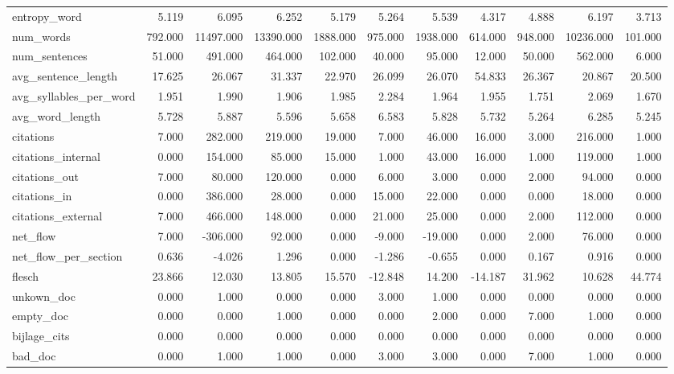 \begin{tabular}{lrrrrrrrrrr}
\cline{1-11}
entropy\_word & 5.119 & 6.095 & 6.252 & 5.179 & 5.264 & 5.539 & 4.317 & 4.888 & 6.197 & 3.713 \\
\cline{1-11}
num\_words & 792.000 & 11497.000 & 13390.000 & 1888.000 & 975.000 & 1938.000 & 614.000 & 948.000 & 10236.000 & 101.000 \\
\cline{1-11}
num\_sentences & 51.000 & 491.000 & 464.000 & 102.000 & 40.000 & 95.000 & 12.000 & 50.000 & 562.000 & 6.000 \\
\cline{1-11}
avg\_sentence\_length & 17.625 & 26.067 & 31.337 & 22.970 & 26.099 & 26.070 & 54.833 & 26.367 & 20.867 & 20.500 \\
\cline{1-11}
avg\_syllables\_per\_word & 1.951 & 1.990 & 1.906 & 1.985 & 2.284 & 1.964 & 1.955 & 1.751 & 2.069 & 1.670 \\
\cline{1-11}
avg\_word\_length & 5.728 & 5.887 & 5.596 & 5.658 & 6.583 & 5.828 & 5.732 & 5.264 & 6.285 & 5.245 \\
\cline{1-11}
citations & 7.000 & 282.000 & 219.000 & 19.000 & 7.000 & 46.000 & 16.000 & 3.000 & 216.000 & 1.000 \\
\cline{1-11}
citations\_internal & 0.000 & 154.000 & 85.000 & 15.000 & 1.000 & 43.000 & 16.000 & 1.000 & 119.000 & 1.000 \\
\cline{1-11}
citations\_out & 7.000 & 80.000 & 120.000 & 0.000 & 6.000 & 3.000 & 0.000 & 2.000 & 94.000 & 0.000 \\
\cline{1-11}
citations\_in & 0.000 & 386.000 & 28.000 & 0.000 & 15.000 & 22.000 & 0.000 & 0.000 & 18.000 & 0.000 \\
\cline{1-11}
citations\_external & 7.000 & 466.000 & 148.000 & 0.000 & 21.000 & 25.000 & 0.000 & 2.000 & 112.000 & 0.000 \\
\cline{1-11}
net\_flow & 7.000 & -306.000 & 92.000 & 0.000 & -9.000 & -19.000 & 0.000 & 2.000 & 76.000 & 0.000 \\
\cline{1-11}
net\_flow\_per\_section & 0.636 & -4.026 & 1.296 & 0.000 & -1.286 & -0.655 & 0.000 & 0.167 & 0.916 & 0.000 \\
\cline{1-11}
flesch & 23.866 & 12.030 & 13.805 & 15.570 & -12.848 & 14.200 & -14.187 & 31.962 & 10.628 & 44.774 \\
\cline{1-11}
unkown\_doc & 0.000 & 1.000 & 0.000 & 0.000 & 3.000 & 1.000 & 0.000 & 0.000 & 0.000 & 0.000 \\
\cline{1-11}
empty\_doc & 0.000 & 0.000 & 1.000 & 0.000 & 0.000 & 2.000 & 0.000 & 7.000 & 1.000 & 0.000 \\
\cline{1-11}
bijlage\_cits & 0.000 & 0.000 & 0.000 & 0.000 & 0.000 & 0.000 & 0.000 & 0.000 & 0.000 & 0.000 \\
\cline{1-11}
bad\_doc & 0.000 & 1.000 & 1.000 & 0.000 & 3.000 & 3.000 & 0.000 & 7.000 & 1.000 & 0.000 \\
\cline{1-11}
\bottomrule
\end{tabular}

